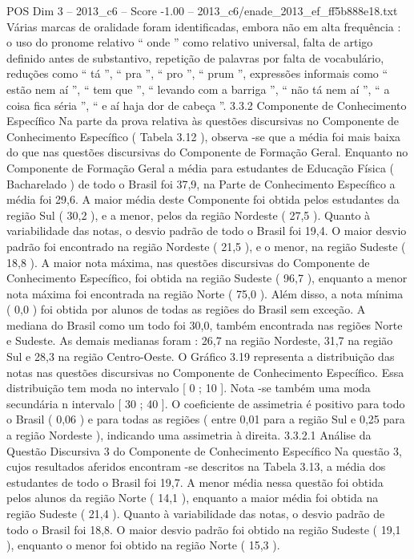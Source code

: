 \begin{textsample}{POS Dim 3 – 2013\_c6 – Score -1.00 – 2013\_c6/enade\_2013\_ef\_ff5b888e18.txt}
Várias marcas de oralidade foram identificadas, embora não em alta frequência : o uso do pronome relativo “ onde ” como relativo universal, falta de artigo definido antes de substantivo, repetição de palavras por falta de vocabulário, reduções como “ tá ”, “ pra ”, “ pro ”, “ prum ”, expressões informais como “ estão nem aí ”, “ tem que ”, “ levando com a barriga ”, “ não tá nem aí ”, “ a coisa fica séria ”, “ e aí haja dor de cabeça ”. 3.3.2 Componente de Conhecimento Específico Na parte da prova relativa às questões discursivas no Componente de Conhecimento Específico ( Tabela 3.12 ), observa -se que a média foi mais baixa do que nas questões discursivas do Componente de Formação Geral.
Enquanto no Componente de Formação Geral a média para estudantes de Educação Física ( Bacharelado ) de todo o Brasil foi 37,9, na Parte de Conhecimento Específico a média foi 29,6.
A maior média deste Componente foi obtida pelos estudantes da região Sul ( 30,2 ), e a menor, pelos da região Nordeste ( 27,5 ).
Quanto à variabilidade das notas, o desvio padrão de todo o Brasil foi 19,4.
O maior desvio padrão foi encontrado na região Nordeste ( 21,5 ), e o menor, na região Sudeste ( 18,8 ).
A maior nota máxima, nas questões discursivas do Componente de Conhecimento Específico, foi obtida na região Sudeste ( 96,7 ), enquanto a menor nota máxima foi encontrada na região Norte ( 75,0 ).
Além disso, a nota mínima ( 0,0 ) foi obtida por alunos de todas as regiões do Brasil sem exceção.
A mediana do Brasil como um todo foi 30,0, também encontrada nas regiões Norte e Sudeste.
As demais medianas foram : 26,7 na região Nordeste, 31,7 na região Sul e 28,3 na região Centro-Oeste.
O Gráfico 3.19 representa a distribuição das notas nas questões discursivas no Componente de Conhecimento Específico.
Essa distribuição tem moda no intervalo [ 0 ; 10 ].
Nota -se também uma moda secundária n intervalo [ 30 ; 40 ].
O coeficiente de assimetria é positivo para todo o Brasil ( 0,06 ) e para todas as regiões ( entre 0,01 para a região Sul e 0,25 para a região Nordeste ), indicando uma assimetria à direita. 3.3.2.1 Análise da Questão Discursiva 3 do Componente de Conhecimento Específico Na questão 3, cujos resultados aferidos encontram -se descritos na Tabela 3.13, a média dos estudantes de todo o Brasil foi 19,7.
A menor média nessa questão foi obtida pelos alunos da região Norte ( 14,1 ), enquanto a maior média foi obtida na região Sudeste ( 21,4 ).
Quanto à variabilidade das notas, o desvio padrão de todo o Brasil foi 18,8.
O maior desvio padrão foi obtido na região Sudeste ( 19,1 ), enquanto o menor foi obtido na região Norte ( 15,3 ).

\end{textsample}
